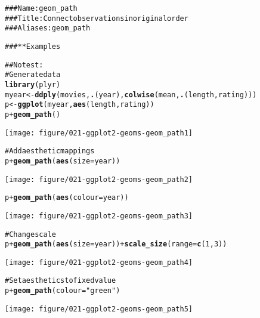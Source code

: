 \documentclass[a4paper,titlepage]{tufte-handout}\usepackage{graphicx, color}
\makeatletter
\def\maxwidth{ %
  \ifdim\Gin@nat@width>\linewidth
    \linewidth
  \else
    \Gin@nat@width
  \fi
}
\newcommand{\hlfunctioncall}[1]{\textcolor[rgb]{0.501960784313725,0,0.329411764705882}{\textbf{#1}}}%
\newcommand{\hlstring}[1]{\textcolor[rgb]{0.6,0.6,1}{#1}}%
\newcommand{\hlcomment}[1]{\textcolor[rgb]{0.180392156862745,0.6,0.341176470588235}{#1}}%
\newenvironment{kframe}{%
 \def\at@end@of@kframe{}%
 \ifinner\ifhmode%
  \def\at@end@of@kframe{\end{minipage}}%
  \begin{minipage}{\columnwidth}%
 \fi\fi%
 \def\FrameCommand##1{\hskip\@totalleftmargin \hskip-\fboxsep
 \colorbox{shadecolor}{##1}\hskip-\fboxsep
     \hskip-\linewidth \hskip-\@totalleftmargin \hskip\columnwidth}%
 \MakeFramed {\advance\hsize-\width
   \@totalleftmargin\z@ \linewidth\hsize
   \@setminipage}}%
 {\par\unskip\endMakeFramed%
 \at@end@of@kframe}
\newenvironment{knitrout}{}{} %
\makeatother
\begin{document}
\begin{knitrout}
\color{fgcolor}\begin{kframe}
\begin{alltt}
\hlcomment{### Name: geom_path}
\hlcomment{### Title: Connect observations in original order}
\hlcomment{### Aliases: geom_path}

\hlcomment{### ** Examples}

\hlcomment{## No test: }
\hlcomment{# Generate data}
\hlfunctioncall{library}(plyr)
myear <- \hlfunctioncall{ddply}(movies, \hlfunctioncall{.}(year), \hlfunctioncall{colwise}(mean, \hlfunctioncall{.}(length, rating)))
p <- \hlfunctioncall{ggplot}(myear, \hlfunctioncall{aes}(length, rating))
p + \hlfunctioncall{geom_path}()
\end{alltt}
\end{kframe}
\texttt{[image: figure/021-ggplot2-geoms-geom\_path1]} 
\begin{kframe}\begin{alltt}

\hlcomment{# Add aesthetic mappings}
p + \hlfunctioncall{geom_path}(\hlfunctioncall{aes}(size = year))
\end{alltt}
\end{kframe}
\texttt{[image: figure/021-ggplot2-geoms-geom\_path2]} 
\begin{kframe}\begin{alltt}
p + \hlfunctioncall{geom_path}(\hlfunctioncall{aes}(colour = year))
\end{alltt}
\end{kframe}
\texttt{[image: figure/021-ggplot2-geoms-geom\_path3]} 
\begin{kframe}\begin{alltt}

\hlcomment{# Change scale}
p + \hlfunctioncall{geom_path}(\hlfunctioncall{aes}(size = year)) + \hlfunctioncall{scale_size}(range = \hlfunctioncall{c}(1, 3))
\end{alltt}
\end{kframe}
\texttt{[image: figure/021-ggplot2-geoms-geom\_path4]} 
\begin{kframe}\begin{alltt}

\hlcomment{# Set aesthetics to fixed value}
p + \hlfunctioncall{geom_path}(colour = \hlstring{"green"})
\end{alltt}
\end{kframe}
\texttt{[image: figure/021-ggplot2-geoms-geom\_path5]} 
\begin{kframe}\begin{alltt}


\end{alltt}
\end{kframe}
\end{knitrout}
\end{document}

